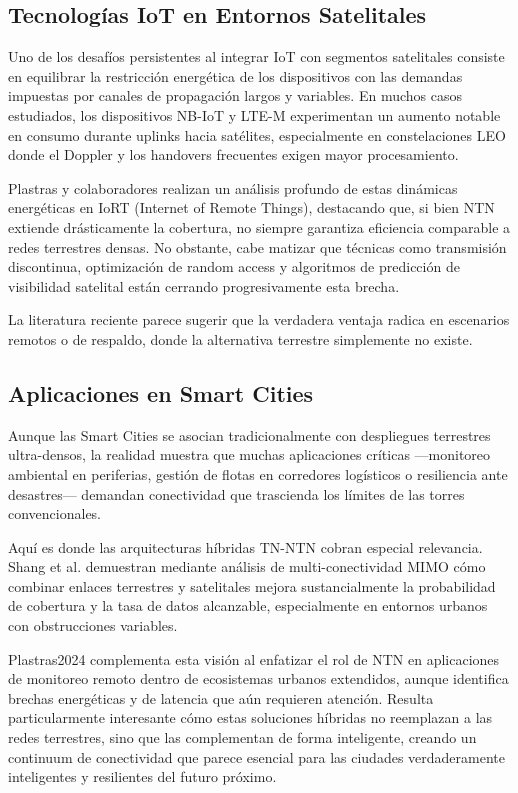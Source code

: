 \subsection{Tecnologías IoT en Entornos Satelitales}

Uno de los desafíos persistentes al integrar IoT con segmentos satelitales consiste en equilibrar la restricción energética de los dispositivos con las demandas impuestas por canales de propagación largos y variables. En muchos casos estudiados, los dispositivos NB-IoT y LTE-M experimentan un aumento notable en consumo durante uplinks hacia satélites, especialmente en constelaciones LEO donde el Doppler y los handovers frecuentes exigen mayor procesamiento. 

Plastras y colaboradores \cite{Plastras2024} realizan un análisis profundo de estas dinámicas energéticas en IoRT (Internet of Remote Things), destacando que, si bien NTN extiende drásticamente la cobertura, no siempre garantiza eficiencia comparable a redes terrestres densas. No obstante, cabe matizar que técnicas como transmisión discontinua, optimización de random access y algoritmos de predicción de visibilidad satelital están cerrando progresivamente esta brecha. 

La literatura reciente parece sugerir que la verdadera ventaja radica en escenarios remotos o de respaldo, donde la alternativa terrestre simplemente no existe.

\subsection{Aplicaciones en Smart Cities}

Aunque las Smart Cities se asocian tradicionalmente con despliegues terrestres ultra-densos, la realidad muestra que muchas aplicaciones críticas —monitoreo ambiental en periferias, gestión de flotas en corredores logísticos o resiliencia ante desastres— demandan conectividad que trascienda los límites de las torres convencionales. 

Aquí es donde las arquitecturas híbridas TN-NTN cobran especial relevancia. Shang et al. \cite{Shang2024} demuestran mediante análisis de multi-conectividad MIMO cómo combinar enlaces terrestres y satelitales mejora sustancialmente la probabilidad de cobertura y la tasa de datos alcanzable, especialmente en entornos urbanos con obstrucciones variables. 

Plastras2024 complementa esta visión al enfatizar el rol de NTN en aplicaciones de monitoreo remoto dentro de ecosistemas urbanos extendidos, aunque identifica brechas energéticas y de latencia que aún requieren atención. Resulta particularmente interesante cómo estas soluciones híbridas no reemplazan a las redes terrestres, sino que las complementan de forma inteligente, creando un continuum de conectividad que parece esencial para las ciudades verdaderamente inteligentes y resilientes del futuro próximo.